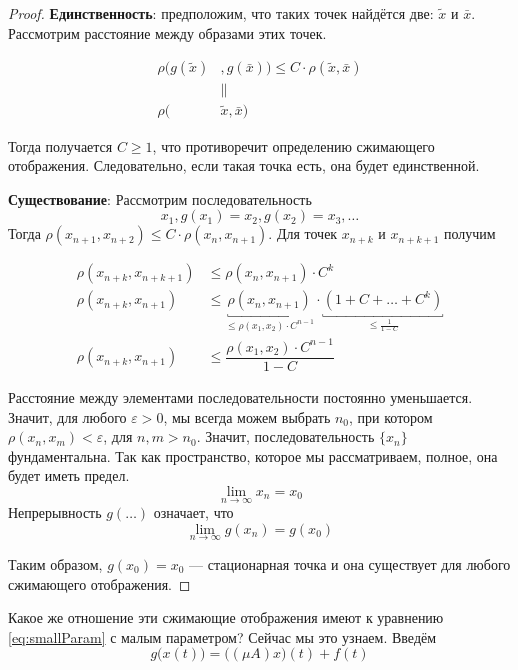 \documentclass[12pt]{article}
\begin{document}
		\begin{proof}
			\textbf{Единственность}: предположим, что таких точек найдётся две: $\tilde{x}$ и $\bar{x}$. Рассмотрим 
			расстояние между образами этих точек.
		
			\begin{align*}
				\rho(g(\tilde{x})&, g(\bar{x})) \leq C \cdot \rho(\tilde{x}, \bar{x}) \\
				&\parallel \\
				\rho(&\tilde{x}, \bar{x})
			\end{align*}
		
			Тогда получается $C \geq 1$, что противоречит определению сжимающего отображения. Следовательно, если такая точка есть, она
			будет единственной.
		
			\textbf{Существование}: Рассмотрим последовательность 
			$$x_1, g(x_1) = x_2, g(x_2) = x_3, \ldots$$
			Тогда $\rho(x_{n+1},x_{n+2}) \leq C \cdot \rho(x_n, x_{n+1})$. Для точек $x_{n+k}$ и $x_{n+k+1}$ получим
		
			\begin{align*}
				\rho(x_{n+k},x_{n+k+1}) &\leq \rho(x_n, x_{n+1}) \cdot C^k \\
				\rho(x_{n+k},x_{n+1}) &\leq \underbracket{\rho(x_n, x_{n+1})}_{\leq \rho(x_1, x_2)\cdot C^{n-1}} 
				\cdot \underbracket{(1 + C + \ldots + C^k)}_{\leq \frac{1	}{1-C}} \\
				\rho(x_{n+k},x_{n+1}) &\leq \dfrac{\rho(x_1, x_2)\cdot C^{n-1}}{1-C}
			\end{align*}
		
			Расстояние между элементами последовательности постоянно уменьшается. Значит, для любого $\varepsilon > 0$, мы 
			всегда можем выбрать $n_0$, при котором $\rho(x_n, x_m) < \varepsilon$, для $n,m > n_0$. Значит, последовательность
			$\{x_n\}$ фундаментальна. Так как пространство, которое мы рассматриваем, полное, она будет иметь предел.		
			$$\underset{n \rightarrow \infty}{\lim} x_n = x_0$$		
			Непрерывность $g(\ldots)$ означает, что 
			$$\underset{n \rightarrow \infty}{\lim} g(x_n) = g(x_0)$$
		
			Таким образом, $g(x_0) = x_0$ --- стационарная точка и она существует для любого сжимающего отображения.
		\end{proof}
	
		Какое же отношение эти сжимающие отображения имеют к уравнению \eqref{eq:smallParam} с малым параметром? 
		Сейчас мы это узнаем. Введём 
		\begin{equation}
			g\big(x(t)\big) = \big((\mu A)x\big)(t) + f(t) \label{eq:compactingFunction}
		\end{equation}
	
\end{document}

